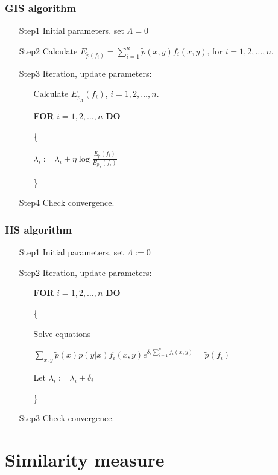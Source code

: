\documentclass[slidestop,compress,mathserif]{beamer}
\begin{document}
	\begin{frame}
		\frametitle{GIS algorithm}
		\begin{itemize}
			\item[Step1] Initial parameters. set $\Lambda = 0$
			\item[Step2] Calculate $E_{\widetilde{p}(f_i)} = \sum_{i=1}^{n}\widetilde{p}(x,y)f_i(x,y)$, for $i=1,2,\ldots,n.$
			\item[Step3] Iteration, update parameters:
			\begin{itemize}
				\item[] Calculate $E_{p_{\Lambda}}(f_i)$, $i=1,2,\ldots,n$.
				\item[] \textbf{FOR} $i=1,2,\ldots,n$ \textbf{DO}
				\item[] \{
				\item[] $\lambda_i := \lambda_i + \eta\log\frac{E_{\widetilde{p}}(f_i)}{E_{p_{\Lambda}}(f_i)}$
				\item[] \}
			\end{itemize}
			\item[Step4] Check convergence.
		\end{itemize} 	
	\end{frame}
	
	\begin{frame}
		\frametitle{IIS algorithm}
		\begin{itemize}
			\item[Step1] Initial parameters, set $\Lambda := 0$
			\item[Step2] Iteration, update parameters:
			\begin{itemize}
				\item[] \textbf{FOR} $i=1,2,\ldots,n$ \textbf{DO}
				\item[] \{
				\item[] 	Solve equations
				\item[]    $\sum_{x,y}\widetilde{p}(x)p(y|x)f_i(x,y)e^{\delta_i\sum_{i=1}^{n}f_i(x,y)} = \widetilde{p}(f_i)$
				\item[] Let $\lambda_i := \lambda_i + \delta_i$
				\item[] \}
			\end{itemize}
			\item[Step3] Check convergence.
		\end{itemize}
	\end{frame}
	
	\section{Similarity measure}
\end{document}
